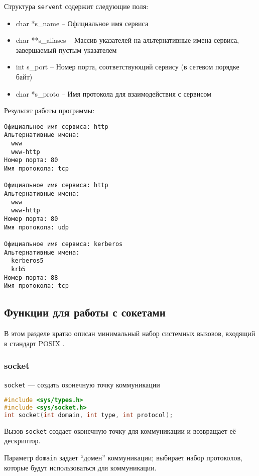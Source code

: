 Структура {\tt servent} содержит следующие поля:
\begin{itemize}
	\item char  *s\_name -- Официальное имя сервиса
	\item char **s\_aliases -- Массив указателей на альтернативные имена сервиса, завершаемый пустым указателем
	\item int    s\_port -- Номер порта, соответствующий сервису (в сетевом порядке байт)
	\item char  *s\_proto -- Имя протокола для взаимодействия с сервисом
\end{itemize}



Результат работы программы:
\begin{verbatim}
Официальное имя сервиса: http
Альтернативные имена:
  www
  www-http
Номер порта: 80
Имя протокола: tcp

Официальное имя сервиса: http
Альтернативные имена:
  www
  www-http
Номер порта: 80
Имя протокола: udp

Официальное имя сервиса: kerberos
Альтернативные имена:
  kerberos5
  krb5
Номер порта: 88
Имя протокола: tcp
\end{verbatim}

\subsection{Функции для работы с сокетами}
В этом разделе кратко описан минимальный набор системных вызовов, входящий в стандарт POSIX \cite{man-pages-01} \cite{man-pages-02}.

\subsubsection{socket}
{\tt socket} --- создать оконечную точку коммуникации   

\begin{lstlisting}[language=C]
#include <sys/types.h> 
#include <sys/socket.h> 
int socket(int domain, int type, int protocol);   
\end{lstlisting}

Вызов {\tt socket} создает оконечную точку для коммуникации и возвращает её дескриптор. 

Параметр {\tt domain} задает ``домен'' коммуникации; выбирает набор протоколов, которые будут использоваться для коммуникации.


